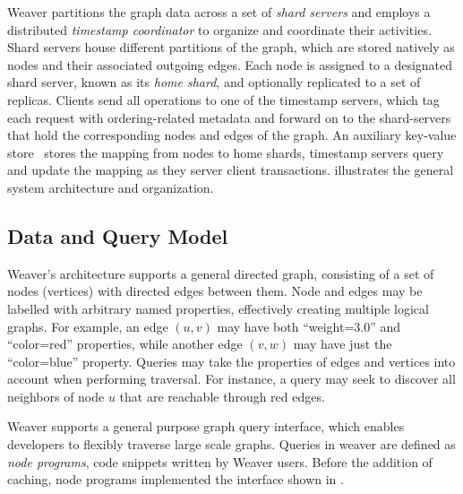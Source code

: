 \documentclass[letterpaper,twocolumn,11pt,tight]{article}
\begin{document}
Weaver partitions the graph data across a set of 
    {\em shard servers} and employs a distributed {\em timestamp coordinator} to
    organize and coordinate their activities.
Shard servers house different partitions of the graph, which are stored
    natively as nodes and their associated outgoing edges. Each node is 
    assigned to a designated shard server, known as its {\em home shard}, 
    and optionally replicated to a set of replicas.
Clients send all operations to one of the timestamp servers, which tag each request with ordering-related
    metadata and forward on to the shard-servers that hold the corresponding
    nodes and edges of the graph. 
An auxiliary key-value store~\cite{warp} stores the mapping from nodes to home shards,
    timestamp servers query and update the mapping as they server client
    transactions.
 illustrates the general system architecture and organization.


\subsection{Data and Query Model}

Weaver's architecture supports a general directed graph, consisting of a set of
    nodes (vertices) with directed edges between them.
Node and edges may be labelled with arbitrary named properties, effectively
    creating multiple logical graphs.
For example, an edge $(u,v)$ may have both ``weight=3.0'' and ``color=red'' properties,
    while another edge $(v,w)$ may have just the ``color=blue'' property.
Queries may take the properties of edges and vertices into account when
    performing traversal. For instance, a query may seek to discover all 
neighbors of node $u$ that are reachable through red edges.

Weaver supports a general purpose graph query interface, which enables developers to flexibly traverse large scale graphs.
Queries in weaver are defined as {\em node programs}, code snippets written by Weaver users.
Before the addition of caching, node programs implemented the interface shown in .
\end{document}
